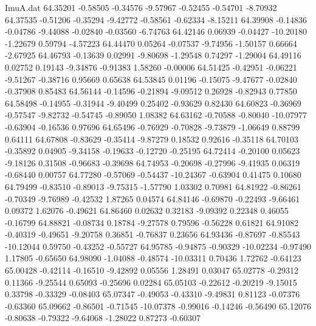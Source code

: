 \begin{filecontents}{ImuA.dat}
  64.35201   -0.58505   -0.34576   -9.57967   -0.52455   -0.54701   -8.70932
  64.37535   -0.51206   -0.35294   -9.42772   -0.58561   -0.62334   -8.15211
  64.39908   -0.14836   -0.04786   -9.44088   -0.02840   -0.03560   -6.74763
  64.42146    0.06939   -0.04427  -10.20180   -1.22679    0.59794   -4.57223
  64.44470    0.05264   -0.07537   -9.74956   -1.50157    0.66664   -2.67925
  64.46793   -0.13639    0.02991   -9.80698   -1.29548    0.74297   -1.29004
  64.49116    0.02752    0.19143   -9.34876   -0.91383    1.58260   -0.00006
  64.51425   -0.42951   -0.06221   -9.51267   -0.38716    0.95669    0.65638
  64.53845    0.01196   -0.15075   -9.47677   -0.02840   -0.37908    0.85483
  64.56144   -0.14596   -0.21894   -9.09512    0.26928   -0.82943    0.77850
  64.58498   -0.14955   -0.31944   -9.40499    0.25402   -0.93629    0.82430
  64.60823   -0.36969   -0.57547   -9.82732   -0.54745   -0.89050    1.08382
  64.63162   -0.70588   -0.80040  -10.07977   -0.63904   -0.16536    0.97696
  64.65496   -0.76929   -0.70828   -9.73879   -1.06649    0.88799    0.64111
  64.67808   -0.83629   -0.35414   -9.87279    0.18532    0.92616   -0.35118
  64.70103   -0.35892    0.04905   -9.34158   -0.19633   -0.12720   -0.25195
  64.72414   -0.20100    0.05623   -9.18126    0.31508   -0.96683   -0.39698
  64.74953   -0.20698   -0.27996   -9.41935    0.06319   -0.68440    0.00757
  64.77280   -0.57069   -0.54437  -10.24367   -0.63904    0.41475    0.10680
  64.79499   -0.83510   -0.89013   -9.75315   -1.57790    1.03302    0.70981
  64.81922   -0.86261   -0.70349   -9.76989   -0.42532    1.87265    0.04574
  64.84146   -0.69870   -0.22493   -9.66461    0.09372    1.62076   -0.49621
  64.86460    0.02632    0.32183   -9.09392    0.22348    0.46055   -0.16799
  64.88821   -0.08734    0.18784   -9.27578    0.79596   -0.56228    0.61821
  64.91082   -0.40319   -0.49651   -9.20758    0.36851   -0.76837    0.23656
  64.93436   -0.87697   -0.85543  -10.12044    0.59750   -0.43252   -0.55727
  64.95785   -0.94875   -0.90329  -10.02234   -0.97490    1.17805   -0.65650
  64.98090   -1.04088   -0.48574  -10.03311    0.70436    1.72762   -0.64123
  65.00428   -0.42114   -0.16510   -9.42892    0.05556    1.28491    0.03047
  65.02778   -0.29312    0.11366   -9.25544    0.65093   -0.25696    0.02284
  65.05103   -0.22612   -0.20219   -9.15015    0.33798   -0.33329   -0.08403
  65.07347   -0.49053   -0.43310   -9.49831    0.81123   -0.07376   -0.63360
  65.09662   -0.86501   -0.71545  -10.07378   -0.99016   -0.14246   -0.56490
  65.12076   -0.80638   -0.79322   -9.64068   -1.28022    0.87273   -0.60307

\end{filecontents}
